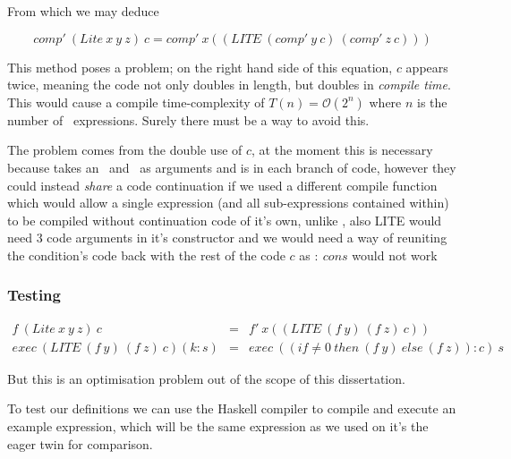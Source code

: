 \documentclass {article}
\begin{document}
From which we may deduce 

	\[ comp'\ (Lite\ x\ y\ z)\ c 
		= comp'\ x ((LITE\ (comp'\ y\ c)\ (comp'\ z\ c))) \]

This method poses a problem;
on the right hand side of this equation,
$c$ appears twice, meaning the code not only 
doubles in length, but doubles in \emph{compile time}.
This would cause a compile time-complexity of
\( T(n) = \mathcal{O}(2^n) \)
where $n$ is the number of \lite\ expressions.
Surely there must be a way to avoid this.

The problem comes from the double use of $c$,
at the moment this is necessary because \compp
takes an \expr\ and \code\ as arguments and is in
each branch of code,
however they could instead \emph{share}
a code continuation if we used a different compile function
which would allow a single expression 
(and all sub-expressions contained within)  
to be compiled without continuation code of it's own,
unlike \compp, also LITE would need 3 code arguments in
it's constructor and we would need a way of 
reuniting the condition's code back with the rest of the code $c$
as $:\ cons$ would not work

\subsubsection*{Testing}

\begin{eqnarray*}
	f\ (Lite\ x\ y\ z)\ c &=& f'\ x ((LITE\ (f\ y)\ (f\ z)\ c)) \\
	exec\ (LITE\ (f\ y)\ (f\ z)\ c) (k : s) 
	&=& exec\ ((if \not=0 \ then\ (f\ y)\ else\ (f\ z)) : c)\ s 
\end{eqnarray*}

But this is an optimisation problem out of the scope of this dissertation.


To test our definitions we can use the Haskell compiler
to compile and execute an example \lite expression,
which will be the same expression as we used
on it's the eager twin for comparison.
\end{document}
